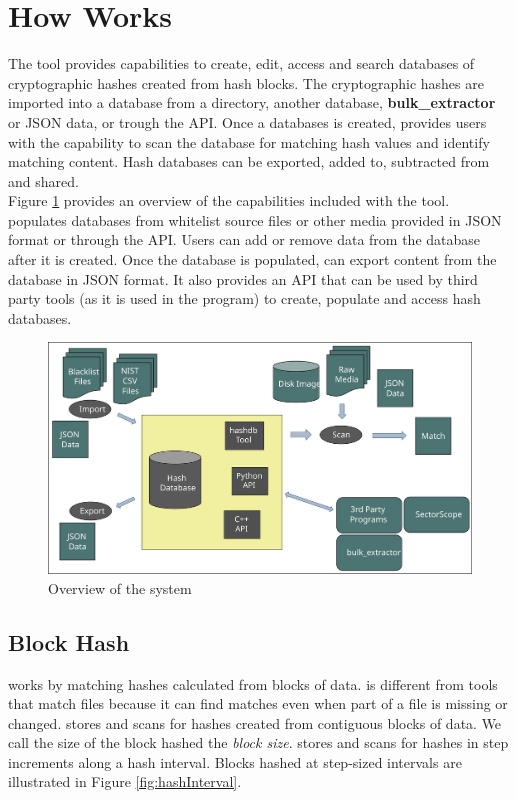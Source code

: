 \documentclass[11pt,fleqn]{article} %
\begin{document}
\section{How \hdb Works}
The \hdb tool provides capabilities to create, edit, access and search databases of cryptographic hashes created from hash blocks. The cryptographic hashes are imported into a database from a directory, another database, \textbf{bulk\_extractor} or JSON data, or trough the \hdb API.
Once a databases is created, \hdb provides users with the capability to scan the database for matching hash values and identify matching content. Hash databases can be exported, added to, subtracted from and shared.\\


Figure \ref{fig:overviewFigure} provides an overview of the capabilities included with the \hdb tool. \hdb populates databases from whitelist source files
or other media provided in JSON format or through the API.
Users can add or remove data from the database after it is created.
Once the database is populated, \hdb can export content from the database in JSON format. It also provides an API that can be used by third party tools (as it is used in the \bulk program) to create, populate and access hash databases.\\

\begin{figure}
	\center
	\includegraphics[scale=.45]{drawings/hashdb_system_overview}
	\caption{Overview of the \hdb system}
	\label{fig:overviewFigure}
\end{figure}

\subsection{Block Hash}
\label{BlockHash}
\hdb works by matching hashes calculated from blocks of data.  \hdb is different from tools that match files because it can find matches even when part of a file is missing or changed.  \hdb stores and scans for hashes created from contiguous blocks of data.  We call the size of the block hashed the \textit{block size}.  \hdb stores and scans for hashes in step increments along a hash interval. Blocks hashed at step-sized intervals are illustrated in Figure \ref{fig:hashInterval}.\\
\end{document}
